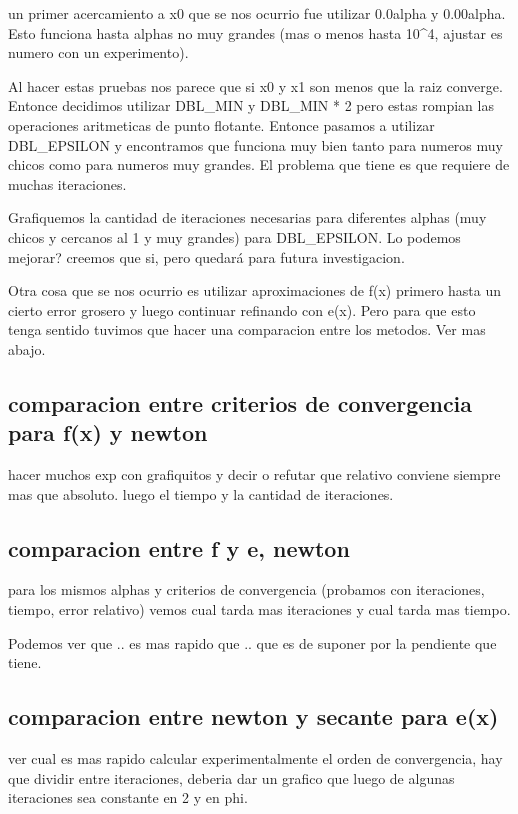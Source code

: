 \documentclass[10pt,a4paper]{article} \usepackage[utf8]{inputenc} %
\begin{document}
un primer acercamiento a x0 que se nos ocurrio fue utilizar 0.0alpha y
0.00alpha. Esto funciona hasta alphas no muy grandes (mas o menos hasta 10^4,
ajustar es numero con un experimento).

Al hacer estas pruebas nos parece que si x0 y x1 son menos que la raiz
converge. Entonce decidimos utilizar DBL_MIN y DBL_MIN * 2 pero estas rompian
las operaciones aritmeticas de punto flotante. Entonce pasamos a utilizar
DBL_EPSILON y encontramos que funciona muy bien tanto para numeros muy chicos
como para numeros muy grandes. El problema que tiene es que requiere de muchas
iteraciones.

Grafiquemos la cantidad de iteraciones necesarias para diferentes alphas (muy
chicos y cercanos al 1 y muy grandes) para DBL_EPSILON. Lo podemos mejorar?
creemos que si, pero quedará para futura investigacion.

Otra cosa que se nos ocurrio es utilizar aproximaciones de f(x) primero hasta
un cierto error grosero y luego continuar refinando con e(x). Pero para que
esto tenga sentido tuvimos que hacer una comparacion entre los metodos. Ver mas
abajo.

\subsection{comparacion entre criterios de convergencia para f(x) y newton}

hacer muchos exp con grafiquitos y decir o refutar que relativo conviene
siempre mas que absoluto. luego el tiempo y la cantidad de iteraciones.

\subsection{comparacion entre f y e, newton}

para los mismos alphas y criterios de convergencia (probamos con iteraciones,
tiempo, error relativo) vemos cual tarda mas iteraciones y cual tarda mas
tiempo.

Podemos ver que .. es mas rapido que .. que es de suponer por la pendiente que
tiene.

\subsection{comparacion entre newton y secante para e(x)}

ver cual es mas rapido
calcular experimentalmente el orden de convergencia, hay que dividir entre
iteraciones, deberia dar un grafico que luego de algunas iteraciones sea
constante en 2 y en phi.
\end{document}
